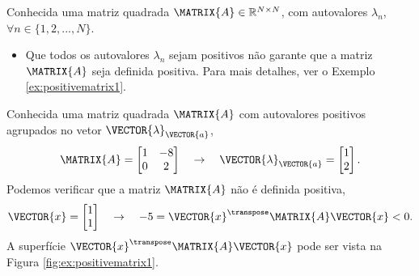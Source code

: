 \begin{tcbattention}
Conhecida uma matriz quadrada $\MATRIX{A} \in \mathbb{R}^{N \times N}$, 
com  autovalores $\lambda_n$, $\forall n \in \{1, 2, ..., N\}$.
\begin{itemize}
\item Que todos os autovalores $\lambda_n$ sejam positivos não garante que a matriz $\MATRIX{A}$
seja definida positiva. Para mais detalhes, ver o Exemplo \ref{ex:positivematrix1}.
\end{itemize}
\end{tcbattention}

\noindent
\begin{minipage}{0.5\textwidth}
\begin{example}
\label{ex:positivematrix1}
Conhecida uma matriz quadrada $\MATRIX{A}$ com autovalores positivos agrupados no vetor $\VECTOR{\lambda}_{\VECTOR{a}}$, 
\begin{equation}
\MATRIX{A}=
\begin{bmatrix}
1 & -8\\
0 & 2
\end{bmatrix}
\quad \rightarrow \quad 
\VECTOR{\lambda}_{\VECTOR{a}}=
\begin{bmatrix}
1 \\
2
\end{bmatrix}.
\end{equation}
Podemos verificar que a matriz $\MATRIX{A}$ não é definida positiva,
\begin{equation}
\VECTOR{x}=
\begin{bmatrix}
1 \\
1
\end{bmatrix}
\quad \rightarrow \quad 
-5 = \VECTOR{x}^{\transpose}\MATRIX{A}\VECTOR{x}<0.
\end{equation}
A superfície $\VECTOR{x}^{\transpose}\MATRIX{A}\VECTOR{x}$ 
pode ser vista na Figura \ref{fig:ex:positivematrix1}.
\end{example}
\end{minipage}
